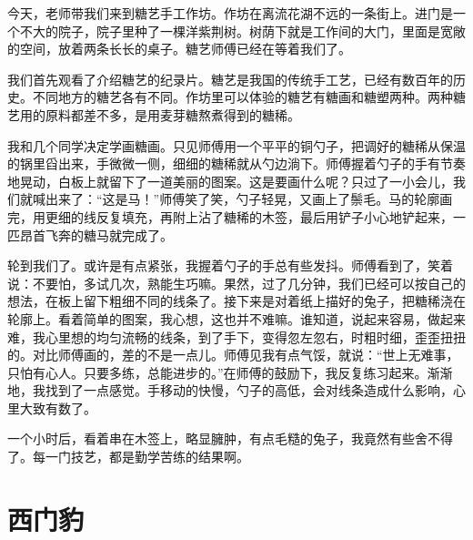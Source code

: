 \documentclass[12pt,UTF-8,openany]{ctexbook}
\begin{document}
\begin{Large}
    
    今天，老师带我们来到糖艺手工作坊。作坊在离流花湖不远的一条街上。进门是一个不大的院子，院子里种了一棵洋紫荆树。树荫下就是工作间的大门，里面是宽敞的空间，放着两条长长的桌子。糖艺师傅已经在等着我们了。
    
    我们首先观看了介绍糖艺的纪录片。糖艺是我国的传统手工艺，已经有数百年的历史。不同地方的糖艺各有不同。作坊里可以体验的糖艺有糖画和糖塑两种。两种糖艺用的原料都差不多，是用麦芽糖熬煮得到的糖稀。
    
    我和几个同学决定学画糖画。只见师傅用一个平平的铜勺子，把调好的糖稀从保温的锅里舀出来，手微微一侧，细细的糖稀就从勺边淌下。师傅握着勺子的手有节奏地晃动，白板上就留下了一道美丽的图案。这是要画什么呢？只过了一小会儿，我们就喊出来了：“这是马！”师傅笑了笑，勺子轻晃，又画上了鬃毛。马的轮廓画完，用更细的线反复填充，再附上沾了糖稀的木签，最后用铲子小心地铲起来，一匹昂首飞奔的糖马就完成了。
    
    轮到我们了。或许是有点紧张，我握着勺子的手总有些发抖。师傅看到了，笑着说：不要怕，多试几次，熟能生巧嘛。果然，过了几分钟，我们已经可以按自己的想法，在板上留下粗细不同的线条了。接下来是对着纸上描好的兔子，把糖稀浇在轮廓上。看着简单的图案，我心想，这也并不难嘛。谁知道，说起来容易，做起来难，我心里想的均匀流畅的线条，到了手下，变得忽左忽右，时粗时细，歪歪扭扭的。对比师傅画的，差的不是一点儿。师傅见我有点气馁，就说：“世上无难事，只怕有心人。只要多练，总能进步的。”在师傅的鼓励下，我反复练习起来。渐渐地，我找到了一点感觉。手移动的快慢，勺子的高低，会对线条造成什么影响，心里大致有数了。
    
    一个小时后，看着串在木签上，略显臃肿，有点毛糙的兔子，我竟然有些舍不得了。每一门技艺，都是勤学苦练的结果啊。
    
\end{Large}

\chapter{西门豹}
\end{document}

